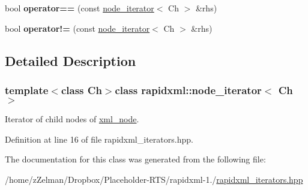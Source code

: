 \begin{DoxyCompactItemize}
\item 
\hypertarget{classrapidxml_1_1node__iterator_a5cb8a3b0d65a1a2517995e986a4debfd}{bool {\bfseries operator==} (const \hyperlink{classrapidxml_1_1node__iterator}{node\-\_\-iterator}$<$ Ch $>$ \&rhs)}\label{classrapidxml_1_1node__iterator_a5cb8a3b0d65a1a2517995e986a4debfd}

\item 
\hypertarget{classrapidxml_1_1node__iterator_a20f1e25347d7e3856694f18597f7c8e2}{bool {\bfseries operator!=} (const \hyperlink{classrapidxml_1_1node__iterator}{node\-\_\-iterator}$<$ Ch $>$ \&rhs)}\label{classrapidxml_1_1node__iterator_a20f1e25347d7e3856694f18597f7c8e2}

\end{DoxyCompactItemize}


\subsection{Detailed Description}
\subsubsection*{template$<$class Ch$>$class rapidxml\-::node\-\_\-iterator$<$ Ch $>$}

Iterator of child nodes of \hyperlink{classrapidxml_1_1xml__node}{xml\-\_\-node}. 

Definition at line 16 of file rapidxml\-\_\-iterators.\-hpp.



The documentation for this class was generated from the following file\-:\begin{DoxyCompactItemize}
\item 
/home/z\-Zelman/\-Dropbox/\-Placeholder-\/\-R\-T\-S/rapidxml-\/1./\hyperlink{rapidxml__iterators_8hpp}{rapidxml\-\_\-iterators.\-hpp}\end{DoxyCompactItemize}
